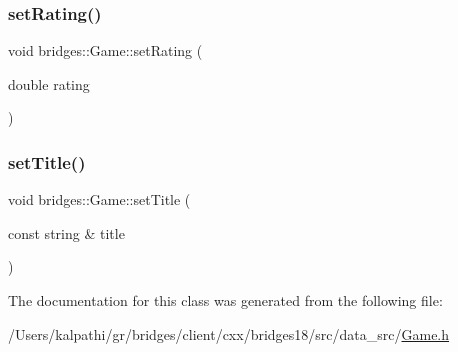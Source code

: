 \mbox{\label{classbridges_1_1_game_a0b9b3180975b2d3028b9090559bb6624}} 
\subsubsection{\texorpdfstring{set\+Rating()}{setRating()}}
{\footnotesize\ttfamily void bridges\+::\+Game\+::set\+Rating (\begin{DoxyParamCaption}\item[{double}]{rating }\end{DoxyParamCaption})\hspace{0.3cm}{\ttfamily [inline]}}

\mbox{\label{classbridges_1_1_game_af5c88115cd037f6d5853fdf1ff79f3a3}} 
\subsubsection{\texorpdfstring{set\+Title()}{setTitle()}}
{\footnotesize\ttfamily void bridges\+::\+Game\+::set\+Title (\begin{DoxyParamCaption}\item[{const string \&}]{title }\end{DoxyParamCaption})\hspace{0.3cm}{\ttfamily [inline]}}



The documentation for this class was generated from the following file\+:\begin{DoxyCompactItemize}
\item 
/\+Users/kalpathi/gr/bridges/client/cxx/bridges18/src/data\+\_\+src/\mbox{\hyperlink{_game_8h}{Game.\+h}}\end{DoxyCompactItemize}
